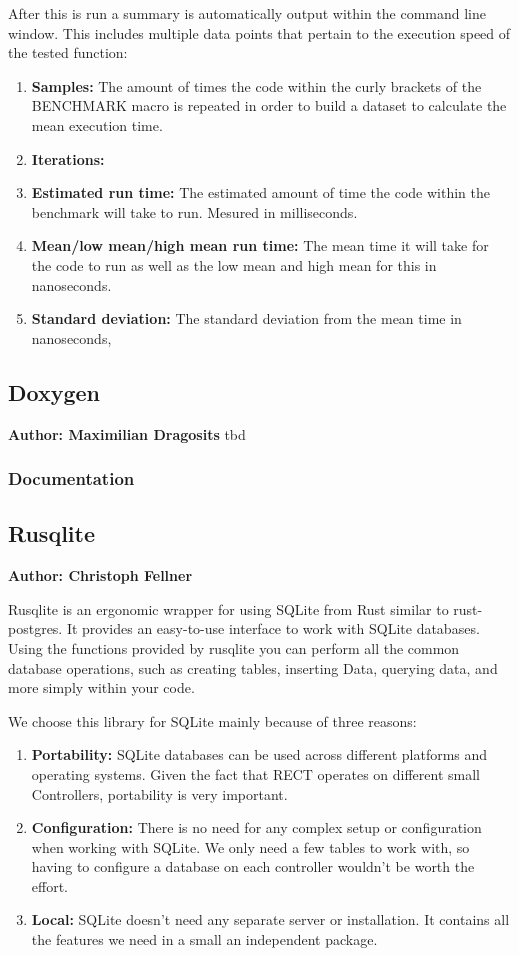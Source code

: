 After this is run a summary is automatically output within the command line window. This includes multiple data points that pertain to the execution speed of the tested
function:
\begin{enumerate}
    \item \textbf{Samples:} The amount of times the code within the curly brackets of the BENCHMARK macro is repeated in order to build a dataset to calculate the mean execution time.
    \item \textbf{Iterations:} %
    \item \textbf{Estimated run time:} The estimated amount of time the code within the benchmark will take to run. Mesured in milliseconds.
    \item \textbf{Mean/low mean/high mean run time:} The mean time it will take for the code to run as well as the low mean and high mean for this in nanoseconds.
    \item \textbf{Standard deviation:} The standard deviation from the mean time in nanoseconds,
\end{enumerate}

\subsection{Doxygen}
\textbf{Author: Maximilian Dragosits}
tbd

\subsubsection{Documentation}

\subsection{Rusqlite}
\textbf{Author: Christoph Fellner}

Rusqlite is an ergonomic wrapper for using SQLite from Rust similar to rust-postgres. It provides an easy-to-use interface to work with SQLite databases. Using the functions provided by rusqlite you can perform all the common database operations, such as creating tables, inserting Data, querying data, and more simply within your code. 

We choose this library for SQLite mainly because of three reasons:
\begin{enumerate}
    \item \textbf{Portability:} SQLite databases can be used across different platforms and operating systems. Given the fact that RECT operates on different small Controllers, portability is very important.
    \item \textbf{Configuration:} There is no need for any complex setup or configuration when working with SQLite. We only need a few tables to work with, so having to configure a database on each controller wouldn't be worth the effort.
    \item \textbf{Local:} SQLite doesn't need any separate server or installation. It contains all the features we need in a small an independent package.
\end{enumerate}

